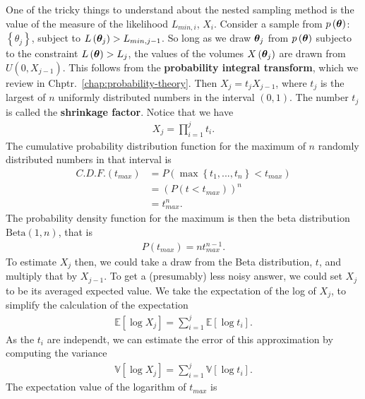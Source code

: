 One of the tricky things to understand about the nested sampling method is the value of the measure of the likelihood $L_{min,i}$, $X_i$.
Consider a sample from $p\left({\bm \theta}\right)$: $\left\{\theta_j\right\}$, subject to
$L\left({\bm \theta}_j\right)>L_{min,j-1}$. 
So long as we draw ${\bm \theta}_j$ from $p\left({\bm \theta}\right)$
subjecto to the constraint $L\left({\bm \theta}\right)>L_j$,
the values of the volumes $X\left({\bm \theta}_j\right)$ are drawn from $U\left(0,X_{j-1}\right)$.
This follows from the \textbf{probability integral transform}, which we review
in Chptr.~\ref{chap:probability-theory}.
Then $X_j = t_j X_{j-1}$, where $t_j$ is the largest of $n$
uniformly distributed numbers in the interval $(0,1)$.
The number $t_j$ is called the \textbf{shrinkage factor}.
Notice that we have 
\begin{align}
    \label{eq:shrinkage-product}
    X_j = \prod_{i=1}^{j} t_i 
    .
\end{align}
The cumulative probability distribution function for the maximum of $n$ randomly
distributed numbers in that interval is
\begin{align}
    C.D.F.\left(t_{max}\right) 
    &=
    P\left(\max\left\{t_1,...,t_n\right\}<t_{max}\right)
    \nonumber\\
    &=
    \left(P\left(t<t_{max}\right)\right)^n
    \nonumber\\
    &=
    t_{max}^{n}
    .
\end{align}
The probability density function for the maximum is then the beta distribution 
$\mathrm{Beta}\left(1,n\right)$, that is
\begin{align}
    P\left(t_{max}\right) 
    =
    n t_{max}^{n-1}
    .
\end{align}
To estimate $X_j$ then, we could take a draw from the Beta distribution, $t$,
and multiply that by $X_{j-1}$.
To get a (presumably) less noisy answer, we could set $X_j$ to be its averaged
expected value.
We take the expectation of the log of $X_j$, to simplify the calculation of the expectation
\begin{align}
    \mathbb{E}\left[\log X_j\right]
    =
    \sum_{i=1}^j \mathbb{E}\left[\log t_i\right]
    .
\end{align}
As the $t_i$ are independt, we can estimate the error of this approximation by 
computing the variance
\begin{align}
    \mathbb{V}\left[\log X_j\right]
    =
    \sum_{i=1}^j \mathbb{V}\left[\log t_i\right]
    .
\end{align}
The expectation value of the logarithm of $t_{max}$ is
